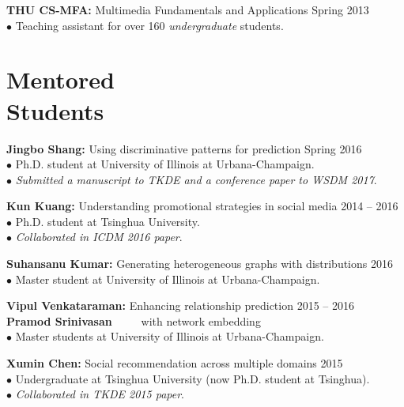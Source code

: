 \documentclass[margin, 10pt]{res}
\begin{document}
\begin{resume}
{\textbf{THU CS-MFA:} Multimedia Fundamentals and Applications} \hfill{Spring 2013} \\
$\bullet$ Teaching assistant for over 160 \textit{undergraduate} students.


\section{Mentored \\ Students}

{\textbf{Jingbo Shang:} Using discriminative patterns for prediction} \hfill{Spring 2016} \\
$\bullet$ Ph.D. student at University of Illinois at Urbana-Champaign. \\
$\bullet$ \textit{Submitted a manuscript to TKDE and a conference paper to WSDM 2017}.

{\textbf{Kun Kuang:} Understanding promotional strategies in social media} \hfill{2014 -- 2016} \\
$\bullet$ Ph.D. student at Tsinghua University. \\
$\bullet$ \textit{Collaborated in ICDM 2016 paper}.

{\textbf{Suhansanu Kumar:} Generating heterogeneous graphs with distributions} \hfill{2016} \\
$\bullet$ Master student at University of Illinois at Urbana-Champaign.

{\textbf{Vipul Venkataraman:} Enhancing relationship prediction} \hfill{2015 -- 2016} \\
{\textbf{Pramod Srinivasan~~~~} with network embedding} \\
$\bullet$ Master students at University of Illinois at Urbana-Champaign.

{\textbf{Xumin Chen:} Social recommendation across multiple domains} \hfill{2015} \\
$\bullet$ Undergraduate at Tsinghua University (now Ph.D. student at Tsinghua). \\
$\bullet$ \textit{Collaborated in TKDE 2015 paper}.


\end{resume}
\end{document}
